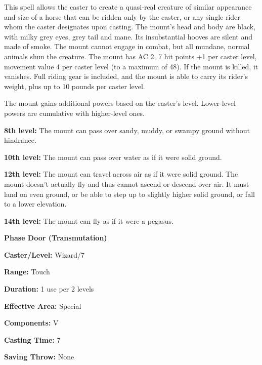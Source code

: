 \begin{multicols}{2}
\begin{minipage}{\columnwidth}
\end{minipage}

This spell allows the caster to create a quasi-real creature of similar appearance and size of a horse that can be ridden only by the caster, or any single rider whom the caster designates upon casting.  The mount's head and body are black, with milky grey eyes, grey tail and mane.  Its insubstantial hooves are silent and made of smoke.  The mount cannot engage in combat, but all mundane, normal animals shun the creature.  The mount has AC 2, 7 hit points +1 per caster level, movement value 4 per caster level (to a maximum of 48).  If the mount is killed, it vanishes.  Full riding gear is included, and the mount is able to carry its rider's weight, plus up to 10 pounds per caster level.

The mount gains additional powers based on the caster's level.  Lower-level powers are cumulative with higher-level ones.

\textbf{8th level:} The mount can pass over sandy, muddy, or swampy ground without hindrance.  

\textbf{10th level:} The mount can pass over water as if it were solid ground.

\textbf{12th level:} The mount can travel across air as if it were solid ground.  The mount doesn't actually fly and thus cannot ascend or descend over air.  It must land on even ground, or be able to step up to slightly higher solid ground, or fall to a lower elevation.

\textbf{14th level:}  The mount can fly as if it were a pegasus.

\vspace{1em}

\noindent
\begin{minipage}{\columnwidth}

\noindent \textbf{Phase Door (Transmutation)}

\noindent \textbf{Caster/Level:} Wizard/7

\noindent \textbf{Range:} Touch

\noindent \textbf{Duration:} 1 use per 2 levels

\noindent \textbf{Effective Area:} Special

\noindent \textbf{Components:} V

\noindent \textbf{Casting Time:} 7

\noindent \textbf{Saving Throw:} None

\end{minipage}


\end{multicols}
